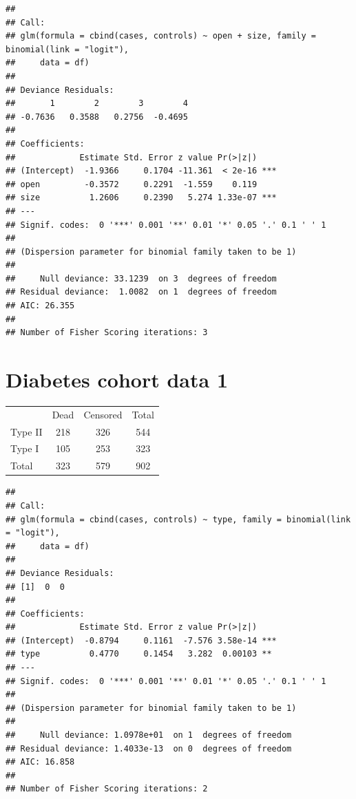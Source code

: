\documentclass[landscape,twocolumn,letterpaper,9pt,reqno]{article}\usepackage[]{graphicx}\usepackage[]{color}
\newenvironment{knitrout}{}{} %
\begin{document}
\begin{knitrout}
\color{fgcolor}
\begin{verbatim}
## 
## Call:
## glm(formula = cbind(cases, controls) ~ open + size, family = binomial(link = "logit"), 
##     data = df)
## 
## Deviance Residuals: 
##       1        2        3        4  
## -0.7636   0.3588   0.2756  -0.4695  
## 
## Coefficients:
##             Estimate Std. Error z value Pr(>|z|)    
## (Intercept)  -1.9366     0.1704 -11.361  < 2e-16 ***
## open         -0.3572     0.2291  -1.559    0.119    
## size          1.2606     0.2390   5.274 1.33e-07 ***
## ---
## Signif. codes:  0 '***' 0.001 '**' 0.01 '*' 0.05 '.' 0.1 ' ' 1
## 
## (Dispersion parameter for binomial family taken to be 1)
## 
##     Null deviance: 33.1239  on 3  degrees of freedom
## Residual deviance:  1.0082  on 1  degrees of freedom
## AIC: 26.355
## 
## Number of Fisher Scoring iterations: 3
\end{verbatim}

\end{knitrout}

\clearpage

\section{Diabetes cohort data 1}

\begin{table}[h]
	\centering
	\begin{tabular}{lcc|c}
		& Dead &  Censored & Total\\
		Type II & 218 & 326 & 544 \\
		Type I & 105 & 253 & 323 \\
		\hline
		Total & 323 & 579 & 902
	\end{tabular}
\end{table}


\begin{knitrout}
\color{fgcolor}
\begin{verbatim}
## 
## Call:
## glm(formula = cbind(cases, controls) ~ type, family = binomial(link = "logit"), 
##     data = df)
## 
## Deviance Residuals: 
## [1]  0  0
## 
## Coefficients:
##             Estimate Std. Error z value Pr(>|z|)    
## (Intercept)  -0.8794     0.1161  -7.576 3.58e-14 ***
## type          0.4770     0.1454   3.282  0.00103 ** 
## ---
## Signif. codes:  0 '***' 0.001 '**' 0.01 '*' 0.05 '.' 0.1 ' ' 1
## 
## (Dispersion parameter for binomial family taken to be 1)
## 
##     Null deviance: 1.0978e+01  on 1  degrees of freedom
## Residual deviance: 1.4033e-13  on 0  degrees of freedom
## AIC: 16.858
## 
## Number of Fisher Scoring iterations: 2
\end{verbatim}

\end{knitrout}
\end{document}
